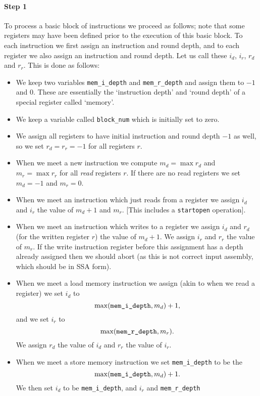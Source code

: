 \paragraph{Step 1}
To process a basic block of instructions we proceed as follows; note
that some registers may have been defined prior to the execution
of this basic block.
To each instruction we first assign an instruction and round depth,
and to each register we also assign an instruction and round depth.
Let us call these $i_d$, $i_r$, $r_d$ and $r_r$.
This is done as follows:
\begin{itemize}
  \item We keep two variables \verb+mem_i_depth+ and \verb+mem_r_depth+
         and assign them to $-1$ and $0$. These are essentially the `instruction depth'
         and `round depth' of a special register called `memory'.
  \item We keep a variable called \verb+block_num+ which is initially set to zero.
  \item We assign all registers to have initial instruction and round depth $-1$
        as well, so we set $r_d=r_r=-1$ for all registers $r$.
  \item When we meet a new instruction we compute $m_d = \max r_d$ and
         $m_r = \max r_r$ for all {\em read} registers $r$. If there are no
         read registers we set $m_d=-1$ and $m_r=0$.
  \item When we meet an instruction which just reads from a register
        we assign $i_d$ and $i_r$ the value of $m_d+1$ and $m_r$.
        [This includes a \verb+startopen+ operation].
  \item When we meet an instruction which writes to a register
    we assign $i_d$ and $r_d$ (for the written register $r$) the value of $m_d+1$.
    We assign $i_r$ and $r_r$ the value of $m_r$.
    If the write instruction register before this assignment has a depth
    already assigned then we should abort (as this is not correct input assembly, which should
    be in SSA form).
  \item When we meet a load memory instruction we assign (akin to when
    we read a register) we set $i_d$ to
    \[ \max(\verb+mem_i_depth+, m_d)+1, \]
    and we set $i_r$ to
    \[ \max(\verb+mem_r_depth+, m_r). \]
    We assign $r_d$ the value of $i_d$ and $r_r$ the value of $i_r$.
  \item When we meet a store memory instruction we set \verb+mem_i_depth+ to be
    the
    \[ \max(\verb+mem_i_depth+, m_d)+1. \]
    We then set $i_d$ to be \verb+mem_i_depth+, and $i_r$ and \verb+mem_r_depth+

\end{itemize}

